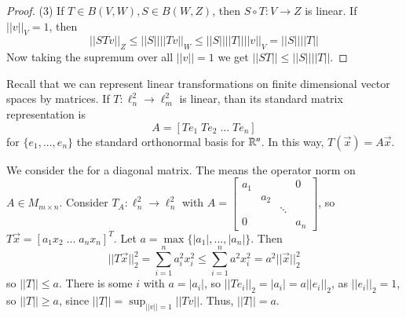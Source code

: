 \begin{proof}
    (3) If $T \in B(V,W), S \in B(W,Z)$, then $S\circ T:V\rightarrow Z$ is linear. If $||v||_V = 1$, then $$||STv||_Z \leq ||S||||Tv||_W \leq ||S||||T||||v||_V = ||S||||T||$$ Now taking the supremum over all $||v|| = 1$ we get $||ST|| \leq ||S||||T||$.
\end{proof}

\begin{remark}
    Recall that we can represent linear transformations on finite dimensional vector spaces by matrices. If $T:\ell_n^2\rightarrow \ell_m^2$ is linear, than its standard matrix representation is $$A = [Te_1\;Te_2\;...\;Te_n]$$ for $\{e_1,...,e_n\}$ the standard orthonormal basis for $\mathbb R^n$. In this way, $T(\vec{x}) = A\vec{x}$.
\end{remark}

\begin{example}
    We consider the  for a diagonal matrix. The  means the operator norm on $A \in M_{m\times n}$. Consider $T_A:\ell_n^2\rightarrow \ell_n^2$ with $A = \begin{bmatrix} a_1 & & & 0 \\ & a_2 & & \\ & & \ddots & \\ 0 & & & a_n\end{bmatrix}$, so $T\vec{x} = [a_1x_2\;...\;a_nx_n]^T$. Let $a = \max\{|a_1|,...,|a_n|\}$. Then $$||T\vec{x}||_2^2 = \sum_{i=1}^na_i^2x_i^2 \leq \sum_{i=1}^na^2x_i^2 = a^2||\vec{x}||_2^2$$ so $||T|| \leq a$. There is some $i$ with $a = |a_i|$, so $||Te_i||_2 =|a_i| = a||e_i||_2$, as $||e_i||_2 = 1$, so $||T|| \geq a$, since $||T|| = \sup_{||v|| = 1}||Tv||$. Thus, $||T|| = a$.
\end{example}

